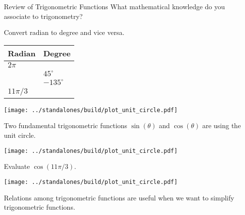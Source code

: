 \documentclass[../main.tex]{subfiles}
\begin{document}
\begin{lesson}{Review of Trigonometric Functions}
  \faComments{} What mathematical knowledge do you associate to trigonometry?

  \begin{example}
    Convert radian to degree and vice versa. 

    \begin{minipage}{.4\textwidth}
      \begin{tabular}{p{1in} | p{1in}}
        Radian & Degree \\\midrule
        \(2\pi\) & \\[2ex] \midrule
                 & \(45^{\circ}\) \\[2ex] \midrule
                 & \(-135^{\circ}\) \\[2ex] \midrule
        \(11\pi/3\) & \\[2ex] \midrule
      \end{tabular}
    \end{minipage}
    \begin{minipage}{.59\textwidth}
      \texttt{[image: ../standalones/build/plot\_unit\_circle.pdf]}
    \end{minipage}
  \end{example}

  Two fundamental trigonometric functions \(\sin(\theta)\) and \(\cos(\theta)\) are  using the unit circle.

  \begin{minipage}{2.5in}
    \texttt{[image: ../standalones/build/plot\_unit\_circle.pdf]}
  \end{minipage}
  \begin{minipage}{4.5in}
  \end{minipage}

  \begin{example}
    Evaluate \(\cos(11\pi/3)\).

    \begin{minipage}{2.5in}
      \texttt{[image: ../standalones/build/plot\_unit\_circle.pdf]}
    \end{minipage}
    \begin{minipage}{4.5in}
    \end{minipage}
  \end{example}
  \clearpage

  Relations among trigonometric functions are useful when we want to simplify trigonometric functions. 


\end{lesson}
\end{document}
